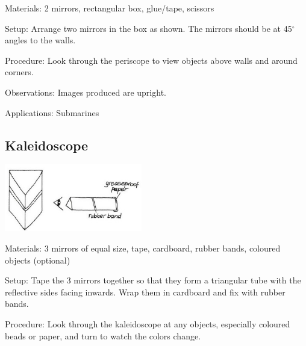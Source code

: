 \begin{multicols}{2}
\begin{description*}
\item[Materials:]{2 mirrors, rectangular box, glue/tape, scissors}
\item[Setup:]{Arrange two mirrors in the box as shown. The mirrors should be at 45$^\circ$ angles to the walls. }
\item[Procedure:]{Look through the periscope to view objects above walls and around corners.}
\item[Observations:]{Images produced are upright.}
\item[Applications:]{Submarines}
\end{description*}

\vfill
\columnbreak

\subsection{Kaleidoscope}

\begin{center}
\includegraphics[width=0.45\textwidth]{./img/vso/kaleidoscope.jpg}
\end{center}

\begin{description*}
\item[Materials:]{3 mirrors of equal size, tape, cardboard, rubber bands, coloured objects (optional)}
\item[Setup:]{Tape the 3 mirrors together so that they form a triangular tube with the reflective sides facing inwards. Wrap them in cardboard and fix with rubber bands.}
\item[Procedure:]{Look through the kaleidoscope at any objects, especially coloured beads or paper, and turn to watch the colors change.}
\end{description*}


\end{multicols}

\pagebreak